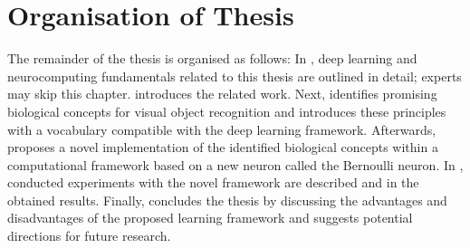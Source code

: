 \section{Organisation of Thesis}
The remainder of the thesis is organised as follows: In , deep learning and neurocomputing fundamentals related to this thesis are outlined in detail; experts may skip this chapter.
 introduces the related work. Next,  identifies promising biological concepts for visual object recognition and introduces these principles with a vocabulary compatible with the deep learning framework.
Afterwards,  proposes a novel implementation of the identified biological concepts within a computational framework based on a new neuron called the Bernoulli neuron.
In , conducted experiments with the novel framework are described and in  the obtained results.
Finally,  concludes the thesis by discussing the advantages and disadvantages of the proposed learning framework and suggests potential directions for future research.
